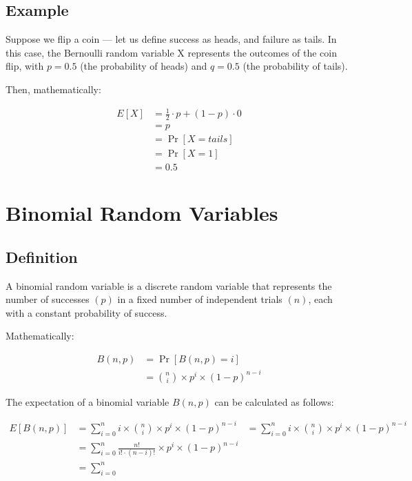     \subsection*{Example}
        Suppose we flip a coin --- let us define success as heads, and failure as tails. In this case, the Bernoulli random variable X represents the outcomes of the coin flip, with \(p = 0.5\) (the probability of heads) and \(q = 0.5\) (the probability of tails).

        Then, mathematically:

        \[
            \begin{aligned}
                E[X] & = \frac{1}{2} \cdot p + (1 - p) \cdot 0\\
                & = p\\
                & = \Pr[X = tails]\\
                & = \Pr[X = 1]\\
                & = 0.5
            \end{aligned}
        \]

\section*{Binomial Random Variables}
    \subsection*{Definition}
        A binomial random variable is a discrete random variable that represents the number of successes \((p)\) in a fixed number of independent trials \((n)\), each with a constant probability of success.

        Mathematically:

        \[
            \begin{aligned}
                B(n, p) & = \Pr[B(n, p) = i]\\
                & = {n \choose i} \times p^i \times (1 - p)^{n - i}
            \end{aligned}
        \]

        The expectation of a binomial variable \(B(n, p)\) can be calculated as follows:

        \[
            \begin{aligned}
                E[B(n, p)] & = \sum_{i = 0}^{n} i \times {n \choose i} \times p^i \times (1 - p)^{n - i}
                & = \sum_{i = 0}^{n} i \times {n \choose i} \times p^i \times (1 - p)^{n - i}\\
                & = \sum_{i = 0}^{n} \frac{n!}{i! \cdot (n - i)!} \times p^i \times (1 - p)^{n - i}\\
                & = \sum_{i = 0}^{n}
            \end{aligned}
        \]

